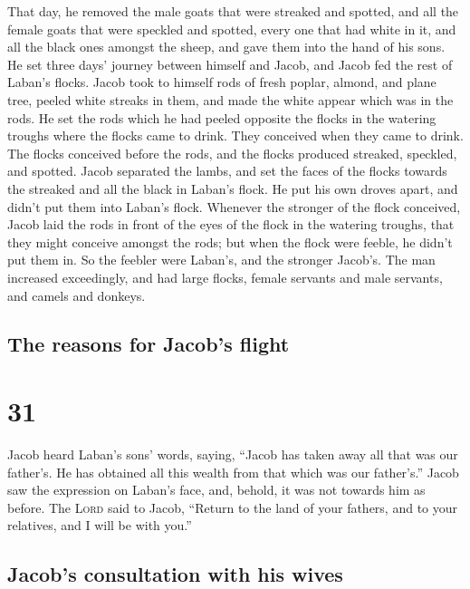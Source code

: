  That day, he removed the male goats that were streaked
and spotted, and all the female goats that were speckled and spotted,
every one that had white in it, and all the black ones amongst the
sheep, and gave them into the hand of his sons.  He set
three days' journey between himself and Jacob, and Jacob fed the rest of
Laban's flocks.  Jacob took to himself rods of fresh
poplar, almond, and plane tree, peeled white streaks in them, and made
the white appear which was in the rods.  He set the rods
which he had peeled opposite the flocks in the watering troughs where
the flocks came to drink. They conceived when they came to drink.
 The flocks conceived before the rods, and the flocks
produced streaked, speckled, and spotted.  Jacob
separated the lambs, and set the faces of the flocks towards the
streaked and all the black in Laban's flock. He put his own droves
apart, and didn't put them into Laban's flock.  Whenever
the stronger of the flock conceived, Jacob laid the rods in front of the
eyes of the flock in the watering troughs, that they might conceive
amongst the rods;  but when the flock were feeble, he
didn't put them in. So the feebler were Laban's, and the stronger
Jacob's.  The man increased exceedingly, and had large
flocks, female servants and male servants, and camels and donkeys.

\hypertarget{the-reasons-for-jacobs-flight}{%
\subsection{The reasons for Jacob's
flight}\label{the-reasons-for-jacobs-flight}}

\hypertarget{section-30}{%
\section{31}\label{section-30}}

 Jacob heard Laban's sons' words, saying, ``Jacob has
taken away all that was our father's. He has obtained all this wealth
from that which was our father's.''  Jacob saw the
expression on Laban's face, and, behold, it was not towards him as
before.  The \textsc{Lord} said to Jacob, ``Return to the
land of your fathers, and to your relatives, and I will be with you.''

\hypertarget{jacobs-consultation-with-his-wives}{%
\subsection{Jacob's consultation with his
wives}\label{jacobs-consultation-with-his-wives}}


